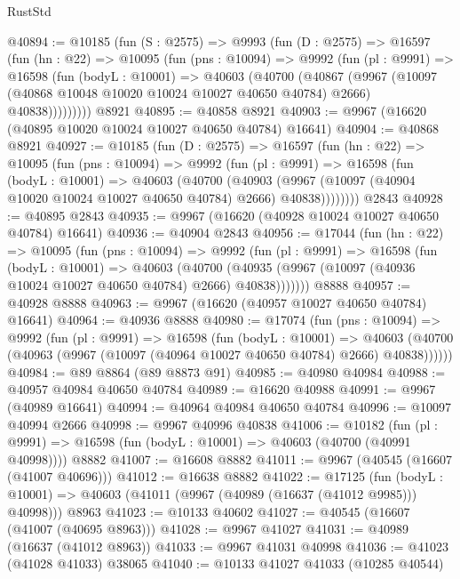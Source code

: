 \begin{lexlean}{RustStd}
\begin{coremodule}
@40894 := @10185
    (fun (S : @2575) =>
    @9993
      (fun (D : @2575) =>
      @16597
        (fun (hn : @22) =>
        @10095
          (fun (pns : @10094) =>
          @9992
            (fun (pl : @9991) =>
            @16598
              (fun (bodyL : @10001) =>
              @40603
                (@40700
                  (@40867
                    (@9967
                      (@10097 (@40868 @10048 @10020 @10024 @10027 @40650 @40784) @2666)
                      @40838)))))))))
    @8921
@40895 := @40858 @8921
@40903 := @9967 (@16620 (@40895 @10020 @10024 @10027 @40650 @40784) @16641)
@40904 := @40868 @8921
@40927 := @10185
    (fun (D : @2575) =>
    @16597
      (fun (hn : @22) =>
      @10095
        (fun (pns : @10094) =>
        @9992
          (fun (pl : @9991) =>
          @16598
            (fun (bodyL : @10001) =>
            @40603
              (@40700
                (@40903
                  (@9967 (@10097 (@40904 @10020 @10024 @10027 @40650 @40784) @2666) @40838))))))))
    @2843
@40928 := @40895 @2843
@40935 := @9967 (@16620 (@40928 @10024 @10027 @40650 @40784) @16641)
@40936 := @40904 @2843
@40956 := @17044
    (fun (hn : @22) =>
    @10095
      (fun (pns : @10094) =>
      @9992
        (fun (pl : @9991) =>
        @16598
          (fun (bodyL : @10001) =>
          @40603
            (@40700 (@40935 (@9967 (@10097 (@40936 @10024 @10027 @40650 @40784) @2666) @40838)))))))
    @8888
@40957 := @40928 @8888
@40963 := @9967 (@16620 (@40957 @10027 @40650 @40784) @16641)
@40964 := @40936 @8888
@40980 := @17074
    (fun (pns : @10094) =>
    @9992
      (fun (pl : @9991) =>
      @16598
        (fun (bodyL : @10001) =>
        @40603 (@40700 (@40963 (@9967 (@10097 (@40964 @10027 @40650 @40784) @2666) @40838))))))
@40984 := @89 @8864 (@89 @8873 @91)
@40985 := @40980 @40984
@40988 := @40957 @40984 @40650 @40784
@40989 := @16620 @40988
@40991 := @9967 (@40989 @16641)
@40994 := @40964 @40984 @40650 @40784
@40996 := @10097 @40994 @2666
@40998 := @9967 @40996 @40838
@41006 := @10182
    (fun (pl : @9991) => @16598 (fun (bodyL : @10001) => @40603 (@40700 (@40991 @40998))))
    @8882
@41007 := @16608 @8882
@41011 := @9967 (@40545 (@16607 (@41007 @40696)))
@41012 := @16638 @8882
@41022 := @17125
    (fun (bodyL : @10001) => @40603 (@41011 (@9967 (@40989 (@16637 (@41012 @9985))) @40998)))
    @8963
@41023 := @10133 @40602
@41027 := @40545 (@16607 (@41007 (@40695 @8963)))
@41028 := @9967 @41027
@41031 := @40989 (@16637 (@41012 @8963))
@41033 := @9967 @41031 @40998
@41036 := @41023 (@41028 @41033) @38065
@41040 := @10133 @41027 @41033 (@10285 @40544)

\end{coremodule}
\end{lexlean}
